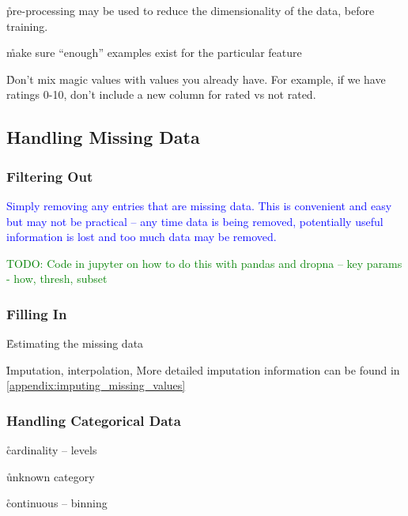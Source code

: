 
\r{pre-processing may be used to reduce the dimensionality of the data, before training.}

\r{make sure ``enough'' examples exist for the particular feature}

\r{Don't mix magic values with values you already have. For example, if we have ratings 0-10, don't include a new column for rated vs not rated.}

\subsection{Handling Missing Data}

\subsubsection{Filtering Out}

\textcolor{blue}{Simply removing any entries that are missing data. This is convenient and easy but may not be practical -- any time data is being removed, potentially useful information is lost and too much data may be removed.}

\textcolor{green}{TODO: Code in jupyter on how to do this with pandas and dropna -- key params - how, thresh, subset}

\subsubsection{Filling In}

\r{Estimating the missing data}

\r{Imputation, interpolation, More detailed imputation information can be found in \ref{appendix:imputing_missing_values}}


\subsubsection{Handling Categorical Data}

\r{cardinality -- levels}

\r{unknown category}

\r{continuous -- binning}


